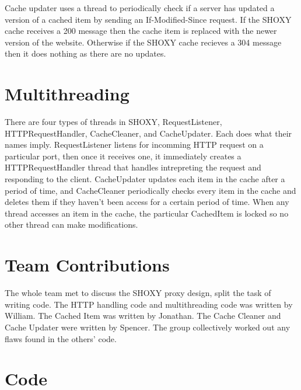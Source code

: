 \documentclass[11pt]{article}
\begin{document}
Cache updater uses a thread to periodically check if a server has updated a version of a cached item by sending an If-Modified-Since request. If the SHOXY cache receives a 200 message then the cache item is replaced with the newer version of the website. Otherwise if the SHOXY cache recieves a 304 message then it does nothing as there are no updates. 

\section{Multithreading}
There are four types of threads in SHOXY, RequestListener, HTTPRequestHandler, CacheCleaner, and CacheUpdater. Each does what their names imply. RequestListener listens for incomming HTTP request on a particular port, then once it receives one, it immediately creates a HTTPRequestHandler thread that handles intrepreting the request and responding to the client. CacheUpdater updates each item in the cache after a period of time, and CacheCleaner periodically checks every item in the cache and deletes them if they haven't been access for a certain period of time. When any thread accesses an item in the cache, the particular CachedItem is locked so no other thread can make modifications.

\section{Team Contributions}
The whole team met to discuss the SHOXY proxy design, split the task of writing code. 
The HTTP handling code and multithreading code was written by William.
The Cached Item was written by Jonathan.
The Cache Cleaner and Cache Updater were  written by Spencer. 
The group collectively worked out any flaws found in the others' code.


\section{Code}
\end{document}
